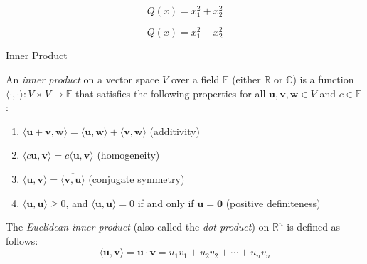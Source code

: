 \documentclass[fullscreen=true, bookmarks=true, hyperref={pdfencoding=unicode}]{beamer}
\begin{document}
\begin{frame}
  $$Q(x) = x_1^2 + x_2^2$$
\end{frame}


\begin{frame}
  $$Q(x) = x_1^2 - x_2^2$$
\end{frame}


\begin{frame}{Inner Product}
  \begin{definition}
  An \textit{inner product} on a vector space $V$ over a field $\mathbb{F}$ (either $\mathbb{R}$ or $\mathbb{C}$) is a function $\langle \cdot, \cdot \rangle: V \times V \to \mathbb{F}$ that satisfies the following properties for all $\mathbf{u}, \mathbf{v}, \mathbf{w} \in V$ and $c \in \mathbb{F}$:
  \begin{enumerate}
      \item $\langle \mathbf{u} + \mathbf{v}, \mathbf{w} \rangle = \langle \mathbf{u}, \mathbf{w} \rangle + \langle \mathbf{v}, \mathbf{w} \rangle$ (additivity)
      \item $\langle c\mathbf{u}, \mathbf{v} \rangle = c\langle \mathbf{u}, \mathbf{v} \rangle$ (homogeneity)
      \item $\langle \mathbf{u}, \mathbf{v} \rangle = \overline{\langle \mathbf{v}, \mathbf{u} \rangle}$ (conjugate symmetry)
      \item $\langle \mathbf{u}, \mathbf{u} \rangle \ge 0$, and $\langle \mathbf{u}, \mathbf{u} \rangle = 0$ if and only if $\mathbf{u} = \mathbf{0}$ (positive definiteness)
  \end{enumerate}
  \end{definition}
  
  \pause
  \begin{example}
  The \textit{Euclidean inner product} (also called the \textit{dot product}) on $\mathbb{R}^n$ is defined as follows:
  \[
  \langle \mathbf{u}, \mathbf{v} \rangle = \mathbf{u} \cdot \mathbf{v} = u_1 v_1 + u_2 v_2 + \cdots + u_n v_n
  \]
  \end{example}
\end{frame}
\end{document}
